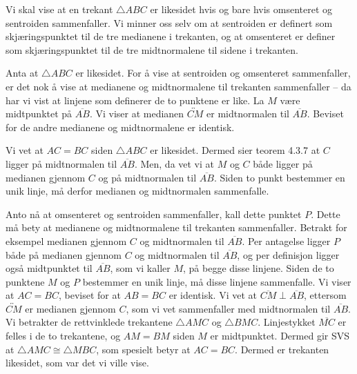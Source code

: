 \begin{oppgave}[5.6.11]
    Vi skal vise at en trekant $\triangle ABC$ er likesidet hvis og bare hvis omsenteret og sentroiden sammenfaller. 
    Vi minner oss selv om at sentroiden er definert som skjæringspunktet til de tre medianene i trekanten, og at omsenteret er definer som skjæringspunktet til de tre midtnormalene til sidene i trekanten. 

    Anta at $\triangle ABC$ er likesidet. 
    For å vise at sentroiden og omsenteret sammenfaller, er det nok å vise at medianene og midtnormalene til trekanten sammenfaller -- da har vi vist at linjene som definerer de to punktene er like. 
    La $M$ være midtpunktet på $\overline{AB}$. 
    Vi viser at medianen $\overleftrightarrow{CM}$ er midtnormalen til $\overline{AB}$. 
    Beviset for de andre medianene og midtnormalene er identisk. 

    Vi vet at $AC=BC$ siden $\triangle ABC$ er likesidet. 
    Dermed sier teorem 4.3.7 at $C$ ligger på midtnormalen til $\overline{AB}$. 
    Men, da vet vi at $M$ og $C$ både ligger på medianen gjennom $C$ og på midtnormalen til $\overline{AB}$. 
    Siden to punkt bestemmer en unik linje, må derfor medianen og midtnormalen sammenfalle. 

    \begin{figure}[H]
        \centering
         
    \end{figure}

    Anto nå at omsenteret og sentroiden sammenfaller, kall dette punktet $P$. 
    Dette må bety at medianene og midtnormalene til trekanten sammenfaller. 
    Betrakt for eksempel medianen gjennom $C$ og midtnormalen til $\overline{AB}$. 
    Per antagelse ligger $P$ både på medianen gjennom $C$ og midtnormalen til $\overline{AB}$, og per definisjon ligger også midtpunktet til $\overline{AB}$, som vi kaller $M$, på begge disse linjene. 
    Siden de to punktene $M$ og $P$ bestemmer en unik linje, må disse linjene sammenfalle. 
    Vi viser at $AC=BC$, beviset for at $AB=BC$ er identisk. 
    Vi vet at $\overline{CM}\perp \overline{AB}$, ettersom $\overleftrightarrow{CM}$ er medianen gjennom $C$, som vi vet sammenfaller med midtnormalen til $\overline{AB}$. 
    Vi betrakter de rettvinklede trekantene $\triangle AMC$ og $\triangle BMC$. 
    Linjestykket $\overline{MC}$ er felles i de to trekantene, og $AM=BM$ siden $M$ er midtpunktet. 
    Dermed gir SVS at $\triangle AMC\cong \triangle MBC$, som spesielt betyr at $AC=BC$. 
    Dermed er trekanten likesidet, som var det vi ville vise. 

    \begin{figure}[H]
        \centering
         
    \end{figure}
\end{oppgave}

